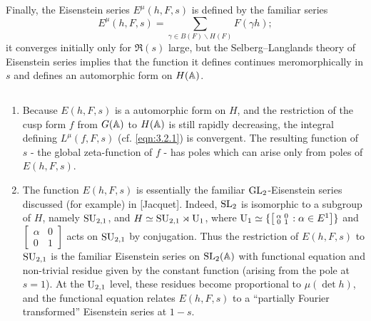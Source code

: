 Finally, the Eisenstein series $E^\mu(h, F, s)$ is defined by the familiar series
\[
    E^\mu(h, F, s) = \sum_{\gamma \in B(F) \backslash H(F)} F(\gamma h);
\]
it converges initially only for $\Re(s)$ large, but the Selberg--Langlands theory of Eisenstein series implies that the function it defines continues meromorphically in $s$ and defines an automorphic form on $H(\mathbb{A})$.


\subsection{}
\label{sec:3.3}
\begin{remark*}
\begin{enumerate}[label=(\roman*)]
    \item Because $E(h,F,s)$ is a automorphic form on $H$, and the restriction of the cusp form $f$ from $G(\mathbb{A})$ to $H(\mathbb{A})$ is still rapidly decreasing, the integral defining $L^\mu(f, F, s)$ (cf. \eqref{eqn:3.2.1}) is convergent.
    The resulting function of $s$ - the global zeta-function of $f$ - has poles which can arise only from poles of $E(h,F,s)$.
    \item The function $E(h, F, s)$ is essentially the familiar $\mathrm{GL}_2$-Eisenstein series discussed (for example) in [Jacquet].
    Indeed, $\mathrm{SL}_2$ is isomorphic to a subgroup of $H$, namely $\mathrm{SU}_{2, 1}$, and $H \simeq \mathrm{SU}_{2, 1} \rtimes \mathrm{U}_{1}$, where $\mathrm{U}_{1}\simeq \{\left[\begin{smallmatrix} \alpha & 0 \\ 0 & 1 \end{smallmatrix}: \alpha \in E^1\right]\}$ and $\left[\begin{smallmatrix}
        \alpha & 0 \\ 0 & 1
    \end{smallmatrix}\right]$ acts on $\mathrm{SU}_{2, 1}$ by conjugation.
    Thus the restriction of $E(h, F, s)$ to $\mathrm{SU}_{2, 1}$ is the familiar Eisenstein series on $\mathrm{SL}_2(\mathbb{A})$ with functional equation and non-trivial residue given by the constant function (arising from the pole at $s = 1$).
    At the $\mathrm{U}_{2, 1}$ level, these residues become proportional to $\mu(\det h)$, and the functional equation relates $E(h, F, s)$ to a ``partially Fourier transformed'' Eisenstein series at $1 - s$.
\end{enumerate}
\end{remark*}


\subsection{}
\label{sec:3.4}

